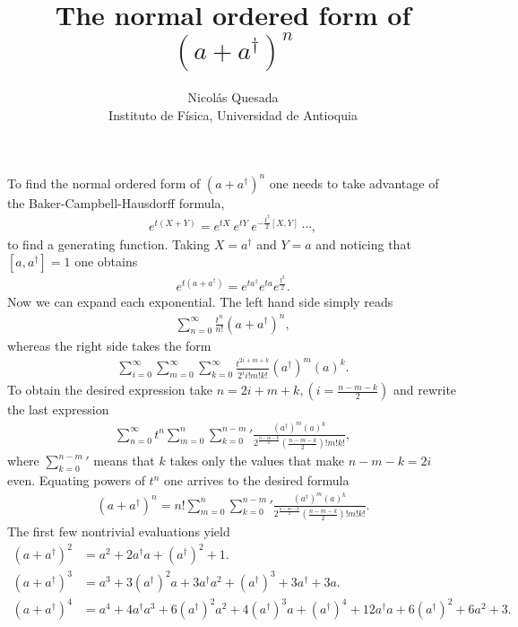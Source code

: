 \documentclass[english,12pt]{shreyasnotes}
\date{}
\title{The normal ordered form of $(a+a^{\dagger})^n$}
\author{Nicol\'as Quesada\\{\small \sf Instituto de F\'isica, Universidad de Antioquia}}
\begin{document}
\maketitle
\thispagestyle{empty}

To find the normal ordered form of $(a+a^{\dagger})^n$ one needs to take advantage 
of the  Baker-Campbell-Hausdorff formula,
\begin{align}
e^{t(X+Y)}= e^{tX}~  e^{tY} ~e^{-\frac{t^2}{2} [X,Y]} ~ \cdots,
\end{align}
to find a generating function. Taking $X=a^{\dagger}$ and $Y=a$ and noticing that $[a,a^{\dagger}]=1$ one obtains
\begin{align}
e^{t(a+a^{\dagger})}=e^{ t a^{\dagger}} e^{t a} e^{\frac{t^2}{2}}.
\end{align}
Now we can expand each exponential. The left hand side simply reads
\begin{align}
\sum_{n=0}^{\infty}\frac{t^n}{n!}\left(a+a^{\dagger} \right)^n,
\end{align}
whereas the right side takes the form
\begin{align}
 \sum_{i=0}^{\infty} \sum_{m=0}^{\infty}  \sum_{k=0}^{\infty} \frac{t^{2i+m+k}}{2^i i! m! k!} (a^{\dagger})^m (a)^k.
\end{align}
To obtain the desired expression take $n=2i+m+k, (i=\frac{n-m-k}{2})$ and rewrite the last expression
\begin{align}
\sum_{n=0}^{\infty} t^n \sum_{m=0}^n  {\sum_{k=0}^{n-m}}{'} \frac{(a^{\dagger})^m (a)^k}{2^{\frac{n-m-k}{2}}\left(\frac{n-m-k}{2}\right)! m! k! },
\end{align}
where ${\sum_{k=0}^{n-m}}{'}$ means that $k$ takes only the values that make $n-m-k=2 i$ even. Equating
powers of $t^n$ one arrives to the desired formula
\begin{align}
\left(a+a^{\dagger} \right)^n = n! \sum_{m=0}^n  {\sum_{k=0}^{n-m}}{'} \frac{(a^{\dagger})^m (a)^k}{2^{\frac{n-m-k}{2}}\left(\frac{n-m-k}{2}\right)! m! k! }.
\end{align}
The first few nontrivial evaluations yield
\begin{subequations}
\begin{align}
\left(a+a^{\dagger} \right)^2 &=  a^2 +2 a^{\dagger}a+\left(a^{\dagger }\right)^2+1. \\
\left(a+a^{\dagger} \right)^3 &= a^3+3 \left(a^{\dagger
   }\right)^2 a +3 a^{\dagger}a^2+\left(a^{\dagger }\right)^3+3 a^{\dagger } +3 a .\\
\left(a+a^{\dagger} \right)^4 &= a^4+4 a^{\dagger }a^3+6 \left(a^{\dagger }\right)^2 a^2+4\left(a^{\dagger }\right)^3 a+\left(a^{\dagger }\right)^4+12 a^{\dagger}a+6\left(a^{\dagger }\right)^2+6 a^2+3.
\end{align}
\end{subequations}
\end{document}
